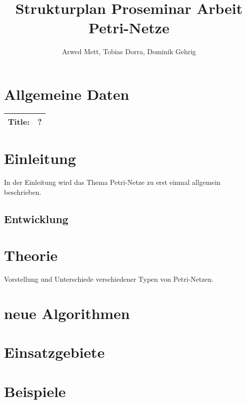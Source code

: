 \documentclass{article}
\author{Arwed Mett, Tobias Dorra, Dominik Gehrig}
\title{Strukturplan Proseminar Arbeit Petri-Netze}
\begin{document}
\maketitle

\section{Allgemeine Daten}
\begin{tabularx}{\textwidth}{|X|X|}
    \hline
    \textbf{Title:} & ?\\
    \hline
\end{tabularx}
\section{Einleitung}
In der Einleitung wird das Thema Petri-Netze zu erst einmal allgemein beschrieben.


\subsection{Entwicklung}

\section{Theorie}
Vorstellung und Unterschiede verschiedener Typen von Petri-Netzen.

\section{neue Algorithmen}

\section{Einsatzgebiete}

\section{Beispiele}
\end{document}
